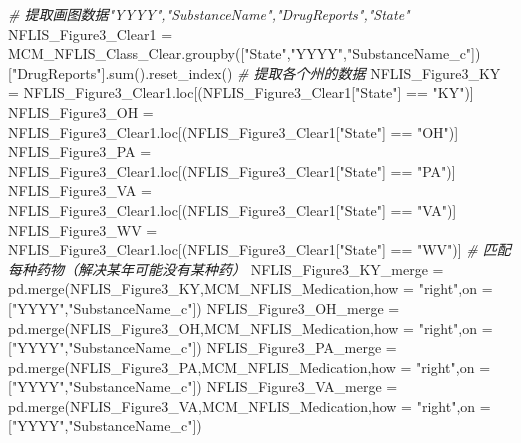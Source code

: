 \documentclass[
]{article}
\newenvironment{Shaded}{}{}
\newcommand{\BuiltInTok}[1]{#1}
\newcommand{\CommentTok}[1]{\textcolor[rgb]{0.38,0.63,0.69}{\textit{#1}}}
\newcommand{\NormalTok}[1]{#1}
\newcommand{\OperatorTok}[1]{\textcolor[rgb]{0.40,0.40,0.40}{#1}}
\newcommand{\StringTok}[1]{\textcolor[rgb]{0.25,0.44,0.63}{#1}}
\begin{document}
\begin{Shaded}
\begin{Highlighting}[]
\CommentTok{\# 提取画图数据"YYYY","SubstanceName","DrugReports","State"}
\NormalTok{NFLIS\_Figure3\_Clear1 }\OperatorTok{=}\NormalTok{ MCM\_NFLIS\_Class\_Clear.groupby([}\StringTok{"State"}\NormalTok{,}\StringTok{"YYYY"}\NormalTok{,}\StringTok{"SubstanceName\_c"}\NormalTok{])[}\StringTok{"DrugReports"}\NormalTok{].}\BuiltInTok{sum}\NormalTok{().reset\_index()}
\CommentTok{\# 提取各个州的数据}
\NormalTok{NFLIS\_Figure3\_KY }\OperatorTok{=}\NormalTok{ NFLIS\_Figure3\_Clear1.loc[(NFLIS\_Figure3\_Clear1[}\StringTok{"State"}\NormalTok{] }\OperatorTok{==} \StringTok{"KY"}\NormalTok{)]}
\NormalTok{NFLIS\_Figure3\_OH }\OperatorTok{=}\NormalTok{ NFLIS\_Figure3\_Clear1.loc[(NFLIS\_Figure3\_Clear1[}\StringTok{"State"}\NormalTok{] }\OperatorTok{==} \StringTok{"OH"}\NormalTok{)]}
\NormalTok{NFLIS\_Figure3\_PA }\OperatorTok{=}\NormalTok{ NFLIS\_Figure3\_Clear1.loc[(NFLIS\_Figure3\_Clear1[}\StringTok{"State"}\NormalTok{] }\OperatorTok{==} \StringTok{"PA"}\NormalTok{)]}
\NormalTok{NFLIS\_Figure3\_VA }\OperatorTok{=}\NormalTok{ NFLIS\_Figure3\_Clear1.loc[(NFLIS\_Figure3\_Clear1[}\StringTok{"State"}\NormalTok{] }\OperatorTok{==} \StringTok{"VA"}\NormalTok{)]}
\NormalTok{NFLIS\_Figure3\_WV }\OperatorTok{=}\NormalTok{ NFLIS\_Figure3\_Clear1.loc[(NFLIS\_Figure3\_Clear1[}\StringTok{"State"}\NormalTok{] }\OperatorTok{==} \StringTok{"WV"}\NormalTok{)]}
\CommentTok{\# 匹配每种药物（解决某年可能没有某种药）}
\NormalTok{NFLIS\_Figure3\_KY\_merge }\OperatorTok{=}\NormalTok{ pd.merge(NFLIS\_Figure3\_KY,MCM\_NFLIS\_Medication,how }\OperatorTok{=} \StringTok{"right"}\NormalTok{,on }\OperatorTok{=}\NormalTok{ [}\StringTok{"YYYY"}\NormalTok{,}\StringTok{"SubstanceName\_c"}\NormalTok{])}
\NormalTok{NFLIS\_Figure3\_OH\_merge }\OperatorTok{=}\NormalTok{ pd.merge(NFLIS\_Figure3\_OH,MCM\_NFLIS\_Medication,how }\OperatorTok{=} \StringTok{"right"}\NormalTok{,on }\OperatorTok{=}\NormalTok{ [}\StringTok{"YYYY"}\NormalTok{,}\StringTok{"SubstanceName\_c"}\NormalTok{])}
\NormalTok{NFLIS\_Figure3\_PA\_merge }\OperatorTok{=}\NormalTok{ pd.merge(NFLIS\_Figure3\_PA,MCM\_NFLIS\_Medication,how }\OperatorTok{=} \StringTok{"right"}\NormalTok{,on }\OperatorTok{=}\NormalTok{ [}\StringTok{"YYYY"}\NormalTok{,}\StringTok{"SubstanceName\_c"}\NormalTok{])}
\NormalTok{NFLIS\_Figure3\_VA\_merge }\OperatorTok{=}\NormalTok{ pd.merge(NFLIS\_Figure3\_VA,MCM\_NFLIS\_Medication,how }\OperatorTok{=} \StringTok{"right"}\NormalTok{,on }\OperatorTok{=}\NormalTok{ [}\StringTok{"YYYY"}\NormalTok{,}\StringTok{"SubstanceName\_c"}\NormalTok{])}

\end{Highlighting}
\end{Shaded}
\end{document}
